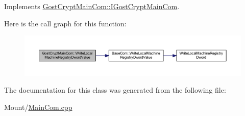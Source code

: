 Implements \hyperlink{interface_gost_crypt_main_com_1_1_i_gost_crypt_main_com}{Gost\+Crypt\+Main\+Com\+::\+I\+Gost\+Crypt\+Main\+Com}.

Here is the call graph for this function\+:
\nopagebreak
\begin{figure}[H]
\begin{center}
\leavevmode
\includegraphics[width=350pt]{class_gost_crypt_main_com_a8dedf36bf770d0929d14bc611743ac07_cgraph}
\end{center}
\end{figure}


The documentation for this class was generated from the following file\+:\begin{DoxyCompactItemize}
\item 
Mount/\hyperlink{_main_com_8cpp}{Main\+Com.\+cpp}\end{DoxyCompactItemize}
